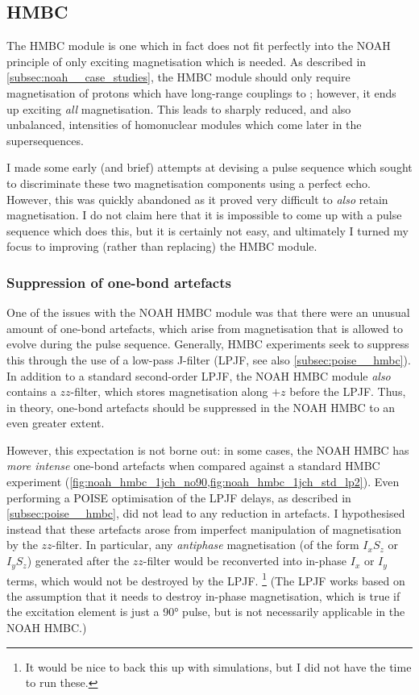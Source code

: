 \subsection{HMBC}
\label{subsec:noah__hmbc}

The HMBC module is one which in fact does not fit perfectly into the NOAH principle of only exciting magnetisation which is needed.
As described in \cref{subsec:noah__case_studies}, the HMBC module should only require magnetisation of protons which have long-range couplings to \carbon{}; however, it ends up exciting \textit{all}  magnetisation.
This leads to sharply reduced, and also unbalanced, intensities of homonuclear modules which come later in the supersequences.

I made some early (and brief) attempts at devising a pulse sequence which sought to discriminate these two magnetisation components using a perfect echo\autocite{Parella2019MRC}.
However, this was quickly abandoned as it proved very difficult to \textit{also} retain  magnetisation.
I do not claim here that it is impossible to come up with a pulse sequence which does this, but it is certainly not easy, and ultimately I turned my focus to improving (rather than replacing) the HMBC module.


\subsubsection{Suppression of one-bond artefacts}

One of the issues with the NOAH HMBC module was that there were an unusual amount of one-bond artefacts, which arise from  magnetisation that is allowed to evolve during the pulse sequence.
Generally, HMBC experiments seek to suppress this through the use of a low-pass J-filter (LPJF, see also \cref{subsec:poise__hmbc}).
In addition to a standard second-order LPJF, the NOAH HMBC module \textit{also} contains a $zz$-filter, which stores  magnetisation along $+z$ before the LPJF.
Thus, in theory, one-bond artefacts should be suppressed in the NOAH HMBC to an even greater extent.

However, this expectation is not borne out: in some cases, the NOAH HMBC has \textit{more intense} one-bond artefacts when compared against a standard HMBC experiment (\cref{fig:noah_hmbc_1jch_no90,fig:noah_hmbc_1jch_std_lp2}).
Even performing a POISE optimisation of the LPJF delays, as described in \cref{subsec:poise__hmbc}, did not lead to any reduction in artefacts.
I hypothesised instead that these artefacts arose from imperfect manipulation of  magnetisation by the $zz$-filter.
In particular, any \textit{antiphase} magnetisation (of the form $I_xS_z$ or $I_yS_z$) generated after the $zz$-filter would be reconverted into in-phase $I_x$ or $I_y$ terms, which would not be destroyed by the LPJF.%
\footnote{It would be nice to back this up with simulations, but I did not have the time to run these.}
(The LPJF works based on the assumption that it needs to destroy in-phase magnetisation, which is true if the excitation element is just a \proton{} \ang{90} pulse, but is not necessarily applicable in the NOAH HMBC.)

